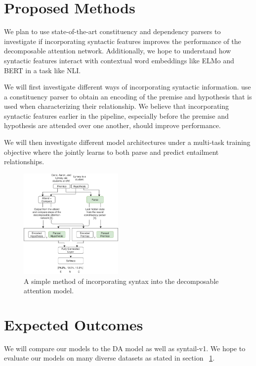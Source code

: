\documentclass[11pt,a4paper]{article}
\begin{document}
\section{Proposed Methods}
\label{methods}

We plan to use state-of-the-art constituency \citep{Stern2017-co} and
dependency \citep{Dozat2016-gs} parsers to investigate if incorporating
syntactic features improves the performance of the decomposable attention
network. Additionally, we hope to understand how syntactic features interact
with contextual
word embeddings like ELMo \citep{Peters2018-fz} and BERT \citep{Devlin2018-qc}
in a task like NLI.

We will first investigate different ways of incorporating syntactic
information. \citet{Pang2018-syntail} use a constituency parser to obtain an
encoding of the premise and hypothesis that is used when characterizing their
relationship. We believe that incorporating syntactic features earlier in the
pipeline, especially before the premise and hypothesis are attended over one
another, should improve performance.

We will then investigate different model architectures under a multi-task
training objective where the jointly learns to both parse and predict
entailment relationships.

\begin{figure}[h]
  \includegraphics[width=0.45\textwidth]{v1}
  \caption{A simple method of incorporating syntax into the decomposable
    attention model.}
\label{figure:v1}
\end{figure}

\section{Expected Outcomes}

We will compare our models to the DA model as well as syntail-v1. We hope to
evaluate our models on many diverse datasets as stated in section
~\ref{methods}.
\end{document}
